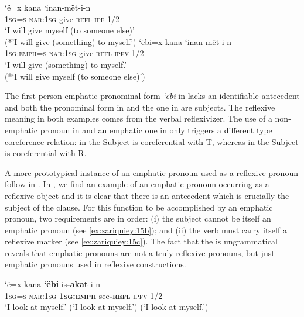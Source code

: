 \documentclass[output=paper,colorlinks,citecolor=brown,modfonts,nonflat]{langscibook}
\begin{document}
\ea%
    \label{ex:zariquiey:14}
    \ea%
    \label{ex:zariquiey:14a}
    \gll    ‘ë=x  kana  ‘inan-mët-i-n\\
            \textsc{1sg=s}    \textsc{nar:1sg}    give-\textsc{refl-ipf-1/2}\\
    \glt    ‘I will give myself (to someone else)’\\
            (*’I will give (something) to myself’)
    \ex%
    \label{ex:zariquiey:14b}
    \gll    ‘ëbi=x    kana    ‘inan-mët-i-n\\
            \textsc{1sg:emph=s}    \textsc{nar:1sg}  give\textsc{{}-refl-ipfv-1/2}\\
    \glt    ‘I will give (something) to myself.’\\
            (*‘I will give myself (to someone else)’)
    \z
\z

The first person emphatic pronominal form \textit{‘ëbi} in  lacks an identifiable antecedent and both the pronominal form in  and the one in  are subjects. The reflexive meaning in both examples comes from the verbal reflexivizer. The use of a non-emphatic pronoun in  and an emphatic one in  only triggers a different type coreference relation: in  the Subject is coreferential with T, whereas in  the Subject is coreferential with R.

A more prototypical instance of an emphatic pronoun used as a reflexive pronoun follow in . In , we find an example of an emphatic pronoun occurring as a reflexive object and it is clear that there is an antecedent which is crucially the subject of the clause. For this function to be accomplished by an emphatic pronoun, two requirements are in order: (i) the subject cannot be itself an emphatic pronoun (see \ref{ex:zariquiey:15b}); and (ii) the verb must carry itself a reflexive marker (see \ref{ex:zariquiey:15c}). The fact that the  is ungrammatical reveals that emphatic pronouns are not a truly reflexive pronouns, but just emphatic pronouns used in reflexive constructions.

\ea%
    \label{ex:zariquiey:15}
    \ea%
    \label{ex:zariquiey:15a}
    \gll    ‘ë=x  kana \textbf{‘ëbi} {is}\textbf{-akat}-i-n\\
            \textsc{1sg=s}  \textsc{nar:1sg}  \textbf{\textsc{1sg:emph}}    see\textbf{{}-}\textbf{\textsc{refl}}\textsc{{}-ipfv}{}-1/2\\
    \glt    ‘I look at myself.’
    \glt    (‘I look at myself.’)
    \glt    (‘I look at myself.’)
    \z
\z
\end{document}
